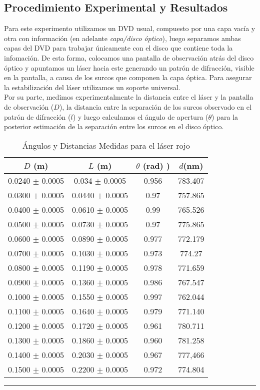 \documentclass[10pt,a4paper]{article}
\begin{document}
\begin{multicols}{2}
		\section{Procedimiento Experimental y Resultados}
		Para este experimento utilizamos un DVD usual, compuesto por una capa vacía y otra con información (en adelante \emph{capa/disco óptico}), luego separamos ambas capas del DVD para trabajar únicamente con el disco que contiene toda la infomación. De esta forma, colocamos una pantalla de observación atrás del disco óptico y apuntamos un láser hacia este generando un patrón de difracción, visible en la pantalla, a causa de los surcos que componen la capa óptica. Para asegurar la estabilización del láser utilizamos un soporte universal.\\
		
		Por su parte, medimos experimentalmente la distancia entre el láser y la pantalla de observación ($D$), la distancia entre la separación de los surcos observado en el patrón de difracción ($l$) y luego calculamos el ángulo de apertura ($\theta$) para la posterior estimación de la separación entre los surcos en el disco óptico.
	\end{multicols}
	
	\begin{table}[H]
		\centering
		\begin{tabular}{|c|c|c|c|}
			\hline
			$D$ (m) & $L$ (m) & $\theta$ (rad) )&  $d$(nm) \\ \hline
			0.0240 $\pm$ 0.0005  & 0.034 $\pm$ 0.0005 &  0.956  & 783.407 \\
			0.0300 $\pm$ 0.0005  & 0.0440 $\pm$ 0.0005 &  0.97  & 757.865\\
			0.0400 $\pm$ 0.0005  & 0.0610 $\pm$ 0.0005 &  0.99  & 765.526\\ 
			0.0500 $\pm$ 0.0005 & 0.0730 $\pm$ 0.0005 & 0.97  & 775.865\\ 
			0.0600 $\pm$ 0.0005 & 0.0890 $\pm$ 0.0005 & 0.977 &  772.179\\ 
			0.0700 $\pm$ 0.0005 & 0.1030 $\pm$ 0.0005 & 0.973  & 774.27 \\
			0.0800 $\pm$ 0.0005  & 0.1190 $\pm$ 0.0005 &  0.978 & 771.659 \\ 
			0.0900 $\pm$ 0.0005 & 0.1360 $\pm$ 0.0005 &  0.986  & 767.547 \\
			0.1000 $\pm$ 0.0005 & 0.1550 $\pm$ 0.0005 &  0.997 & 762.044  \\
			0.1100 $\pm$ 0.0005 & 0.1640 $\pm$ 0.0005 &  0.979  & 771.140 \\
			0.1200 $\pm$ 0.0005 & 0.1720 $\pm$ 0.0005 &  0.961  & 780.711  \\
			0.1300 $\pm$ 0.0005 & 0.1860 $\pm$ 0.0005 &  0.960 & 781.258 \\
			0.1400 $\pm$ 0.0005 & 0.2030 $\pm$ 0.0005 &  0.967 & 777,466  \\
			0.1500 $\pm$ 0.0005 & 0.2200 $\pm$ 0.0005 &  0.972 & 774.804  \\ \hline
			
		\end{tabular}
		\caption{Ángulos y Distancias Medidas para el láser rojo}
		\label{tab:angulos_distancias.}
		\rule{100mm}{0.1mm}
	\end{table}
	
\end{document}
